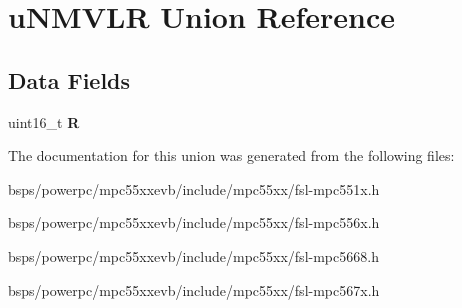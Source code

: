 \hypertarget{unionuNMVLR}{}\section{u\+N\+M\+V\+LR Union Reference}
\label{unionuNMVLR}
\subsection*{Data Fields}
\begin{DoxyCompactItemize}
\item 
\mbox{\label{unionuNMVLR_a03a9b0022ec6581a2517e371924e5177}} 
uint16\+\_\+t {\bfseries R}
\end{DoxyCompactItemize}


The documentation for this union was generated from the following files\+:\begin{DoxyCompactItemize}
\item 
bsps/powerpc/mpc55xxevb/include/mpc55xx/fsl-\/mpc551x.\+h\item 
bsps/powerpc/mpc55xxevb/include/mpc55xx/fsl-\/mpc556x.\+h\item 
bsps/powerpc/mpc55xxevb/include/mpc55xx/fsl-\/mpc5668.\+h\item 
bsps/powerpc/mpc55xxevb/include/mpc55xx/fsl-\/mpc567x.\+h\end{DoxyCompactItemize}
